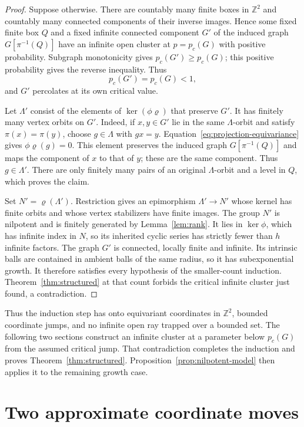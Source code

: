 \documentclass[11pt]{article}
\theoremstyle{definition}
\begin{document}
\begin{proof}
Suppose otherwise. There are countably many finite boxes in
$\mathbb Z^2$ and countably many connected components of their inverse
images. Hence some fixed finite box $Q$ and a fixed infinite connected
component $G'$ of the induced graph $G[\pi^{-1}(Q)]$ have an infinite
open cluster at $p=p_c(G)$ with positive probability. Subgraph
monotonicity gives $p_c(G')\ge p_c(G)$; this positive probability
gives the reverse inequality. Thus
\[
 p_c(G')=p_c(G)<1,
\]
and $G'$ percolates at its own critical value.

Let $\Lambda'$ consist of the elements of $\ker(\phi\varrho)$ that
preserve $G'$. It has finitely many vertex orbits on $G'$. Indeed,
if $x,y\in G'$ lie in the same $\Lambda$-orbit and satisfy
$\pi(x)=\pi(y)$, choose $g\in\Lambda$ with $gx=y$.
Equation~\eqref{eq:projection-equivariance} gives
$\phi\varrho(g)=0$. This element preserves the induced graph
$G[\pi^{-1}(Q)]$ and maps the component of $x$ to that of $y$;
these are the same component. Thus $g\in\Lambda'$. There are only
finitely many pairs of an original $\Lambda$-orbit and a level in $Q$,
which proves the claim.

Set $N'=\varrho(\Lambda')$. Restriction gives an epimorphism
$\Lambda'\to N'$ whose kernel has finite orbits and whose vertex
stabilizers have finite images. The group $N'$ is nilpotent and is
finitely generated by Lemma~\ref{lem:rank}. It lies in $\ker\phi$,
which has infinite index in $N$, so its inherited cyclic series has
strictly fewer than $h$ infinite factors. The graph $G'$ is connected,
locally finite and infinite. Its intrinsic balls are contained in
ambient balls of the same radius, so it has subexponential growth.
It therefore satisfies every hypothesis of the smaller-count
induction. Theorem~\ref{thm:structured} at that count forbids the
critical infinite cluster just found, a contradiction.
\end{proof}

Thus the induction step has onto equivariant coordinates in
\(\mathbb Z^2\), bounded coordinate jumps, and no infinite open ray
trapped over a bounded set. The following two sections construct an
infinite cluster at a parameter below \(p_c(G)\) from the assumed
critical jump. That contradiction completes the induction and proves
Theorem~\ref{thm:structured}. Proposition~\ref{prop:nilpotent-model}
then applies it to the remaining growth case.

\section{Two approximate coordinate moves}\label{sec:moves}
\end{document}
